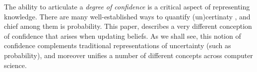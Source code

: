 \def\stmt{$A$}

The ability to articulate a \emph{degree of confidence} 
is a critical aspect of representing knowledge.
There are 
many well-established ways to quantify (un)certinaty \parencite[\S2]{halpern2017reasoning},
	and chief among them is probability.
This paper, describes a very different conception of confidence
that arises when updating beliefs. 
As we shall see, this notion of confidence
complements traditional representations of uncertainty (such as probability), 
and moreover unifies a number of different concepts across computer science.


